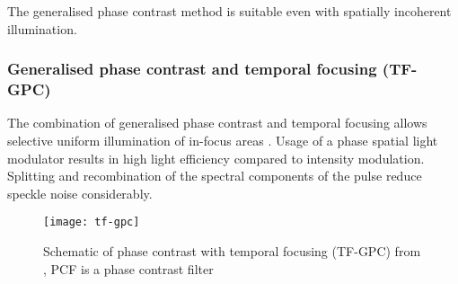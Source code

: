 The generalised phase contrast method is suitable even with spatially
incoherent illumination.
\subsubsection{Generalised phase contrast and temporal focusing (TF-GPC)}
The combination of generalised phase contrast and temporal focusing
allows selective uniform illumination of in-focus areas
\citep{Papagiakoumou2010}. Usage of a phase spatial light modulator
results in high light efficiency compared to intensity modulation.
Splitting and recombination of the spectral components of the pulse
reduce speckle noise considerably.
\begin{figure}[!hbt]
  \centering
  \texttt{[image: tf-gpc]} 
  \caption{Schematic of phase contrast with temporal focusing (TF-GPC)
    from \citep{Papagiakoumou2010}, PCF is a phase contrast filter}
  \label{fig:tf-gpc}
\end{figure}
